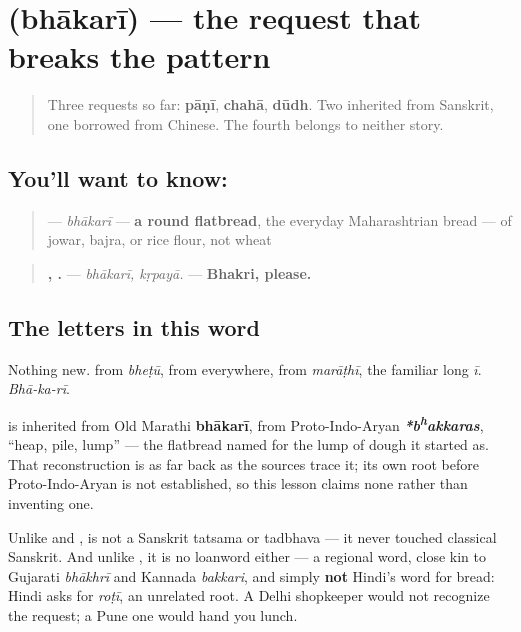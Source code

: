 \section[bhākarī]{ (bhākarī) — the request that breaks the pattern}

\label{lesson:MR-C10-bhakari}



\begin{quote}
Three requests so far: \textbf{pāṇī}, \textbf{chahā}, \textbf{dūdh}. Two inherited from Sanskrit, one borrowed from Chinese. The fourth belongs to neither story.
\end{quote}

\subsection*{You'll want to know: }
\begin{quote}
\textbf{} — \emph{bhākarī} — \textbf{a round flatbread}, the everyday Maharashtrian bread — of jowar, bajra, or rice flour, not wheat
\end{quote}

\begin{quote}
\textbf{, .} — \emph{bhākarī, kṛpayā.} — \textbf{Bhakri, please.}
\end{quote}

\subsection*{The letters in this word}
Nothing new. \textbf{} from \emph{bheṭū}, \textbf{} from everywhere, \textbf{} from \emph{marāṭhī}, \textbf{} the familiar long \emph{ī}. \emph{Bhā-ka-rī}.

\begin{cousinweb}
\textbf{} is inherited from Old Marathi \textbf{bhākarī}, from Proto-Indo-Aryan \emph{\textbf{*b\textsuperscript{h}akkaras}}, \textquotedblleft{}heap, pile, lump\textquotedblright{} — the flatbread named for the lump of dough it started as. That reconstruction is as far back as the sources trace it; its own root before Proto-Indo-Aryan is not established, so this lesson claims none rather than inventing one.

Unlike \textbf{} and \textbf{}, \textbf{} is not a Sanskrit tatsama or tadbhava — it never touched classical Sanskrit. And unlike \textbf{}, it is no loanword either — a regional word, close kin to Gujarati \emph{bhākhrī} and Kannada \emph{bakkari}, and simply \textbf{not} Hindi's word for bread: Hindi asks for \textbf{} \emph{roṭī}, an unrelated root. A Delhi shopkeeper would not recognize the request; a Pune one would hand you lunch.
\end{cousinweb}

